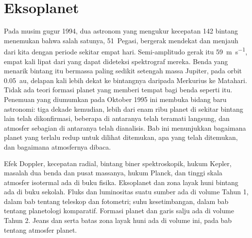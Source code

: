 \chapter{Eksoplanet}\label{ch:b3:exoplanets}

Pada musim gugur 1994, dua astronom yang mengukur kecepatan 142
bintang menemukan bahwa salah satunya, 51~Pegasi, bergerak mendekat dan menjauh
dari kita dengan periode sekitar empat hari. Semi-amplitudo gerak itu
\qty{59}{m.s^{-1}}, empat kali lipat dari yang dapat dideteksi spektrograf mereka. Benda
yang menarik bintang itu bermassa paling sedikit setengah massa
Jupiter, pada orbit \qty{0.05}{au}, delapan kali lebih dekat ke bintangnya
daripada Merkurius ke Matahari. Tidak ada teori formasi planet yang memberi tempat bagi
benda seperti itu. Penemuan yang diumumkan pada Oktober 1995 ini membuka bidang baru
astronomi: tiga dekade kemudian, lebih dari enam ribu planet di sekitar
bintang lain telah dikonfirmasi, beberapa di antaranya telah teramati langsung, dan
atmosfer sebagian di antaranya telah dianalisis. Bab ini menunjukkan bagaimana planet
yang terlalu redup untuk dilihat ditemukan, apa yang telah ditemukan, dan bagaimana atmosfernya
dibaca.

\begin{recall}
Efek Doppler, kecepatan radial, bintang biner spektroskopik, hukum Kepler,
masalah dua benda dan pusat massanya, hukum Planck, dan
tinggi skala atmosfer isotermal ada di buku fisika. Eksoplanet
dan zona layak huni bintang ada di buku sekolah. Fluks
dan luminositas suatu sumber ada di volume Tahun 1, dalam
bab tentang teleskop dan fotometri; suhu kesetimbangan, dalam
bab tentang planetologi komparatif. Formasi planet dan garis salju
ada di volume Tahun 2. Jeans dan  serta batas
zona layak huni ada di volume ini, pada bab tentang
atmosfer planet.
\end{recall}


